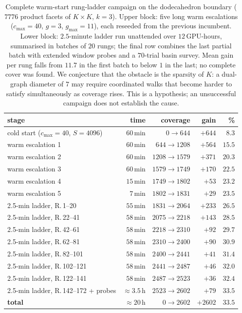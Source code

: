 \documentclass[12pt]{article}
\begin{document}
\begin{table}[H]
\centering\footnotesize
\begin{tabular}{@{}lrrrr@{}}
\toprule
stage & time & coverage & gain & \% \\
\midrule
cold start ($c_{\max}=40$, $S=4096$) &
  $60$\,min & $0\to 644$ & $+644$ & $8.3$ \\
warm escalation 1 &
  $60$\,min & $644\to 1208$ & $+564$ & $15.5$ \\
warm escalation 2 &
  $60$\,min & $1208\to 1579$ & $+371$ & $20.3$ \\
warm escalation 3 &
  $60$\,min & $1579\to 1749$ & $+170$ & $22.5$ \\
warm escalation 4 &
  $15$\,min & $1749\to 1802$ & $+53$ & $23.2$ \\
warm escalation 5 &
  $7$\,min & $1802\to 1831$ & $+29$ & $23.5$ \\
\midrule
2.5-min ladder, R.\,1--20 &
  $55$\,min & $1831\to 2064$ & $+233$ & $26.5$ \\
2.5-min ladder, R.\,22--41 &
  $58$\,min & $2075\to 2218$ & $+143$ & $28.5$ \\
2.5-min ladder, R.\,42--61 &
  $58$\,min & $2218\to 2310$ & $+92$ & $29.7$ \\
2.5-min ladder, R.\,62--81 &
  $58$\,min & $2310\to 2400$ & $+90$ & $30.9$ \\
2.5-min ladder, R.\,82--101 &
  $58$\,min & $2400\to 2441$ & $+41$ & $31.4$ \\
2.5-min ladder, R.\,102--121 &
  $58$\,min & $2441\to 2487$ & $+46$ & $32.0$ \\
2.5-min ladder, R.\,122--141 &
  $58$\,min & $2487\to 2523$ & $+36$ & $32.4$ \\
2.5-min ladder, R.\,142--172 + probes &
  ${\approx}3.5$\,h & $2523\to 2602$ & $+79$ & $33.5$ \\
\midrule
\textbf{total} &
  ${\approx}20$\,h & $0\to 2602$ & $+2602$ & $33.5$ \\
\bottomrule
\end{tabular}
\caption{Complete warm-start rung-ladder campaign on the dodecahedron boundary
($7776$ product facets of $K\times K$, $k=3$).
Upper block: five long warm escalations ($c_{\max}=40$, $g=3$, $g_{\max}=11$),
each reseeded from the previous incumbent.
Lower block: $2.5$-minute ladder run unattended over $12$\,GPU-hours,
summarised in batches of $20$ rungs; the final row combines the last partial
batch with extended window probes and a $70$-trial basin survey.
Mean gain per rung falls from $11.7$ in the first batch to below $1$ in
the last; no complete cover was found.
We conjecture that the obstacle is the sparsity of $K$: a dual-graph
diameter of $7$ may require coordinated walks that become harder to
satisfy simultaneously as coverage rises.  This is a hypothesis; an
unsuccessful campaign does not establish the cause.}
\label{tab:dodeca}
\end{table}
\end{document}

